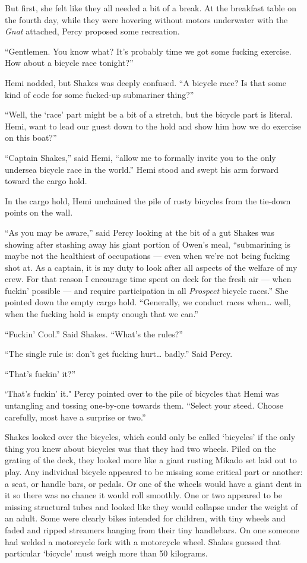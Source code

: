 \documentclass[]{scrbook}
\begin{document}
But first, she felt like they all needed a bit of a break. At the
breakfast table on the fourth day, while they were hovering without
motors underwater with the \emph{Gnat} attached, Percy proposed some
recreation.

``Gentlemen. You know what? It's probably time we got some fucking
exercise. How about a bicycle race tonight?''

Hemi nodded, but Shakes was deeply confused. ``A bicycle race? Is that
some kind of code for some fucked-up submariner thing?''

``Well, the `race' part might be a bit of a stretch, but the bicycle
part is literal. Hemi, want to lead our guest down to the hold and show
him how we do exercise on this boat?''

``Captain Shakes,'' said Hemi, ``allow me to formally invite you to the
only undersea bicycle race in the world.'' Hemi stood and swept his arm
forward toward the cargo hold.

In the cargo hold, Hemi unchained the pile of rusty bicycles from the
tie-down points on the wall.

``As you may be aware,'' said Percy looking at the bit of a gut Shakes
was showing after stashing away his giant portion of Owen's meal,
``submarining is maybe not the healthiest of occupations --- even when
we're not being fucking shot at. As a captain, it is my duty to look
after all aspects of the welfare of my crew. For that reason I encourage
time spent on deck for the fresh air --- when fuckin' possible --- and
require participation in all \emph{Prospect} bicycle races.'' She
pointed down the empty cargo hold. ``Generally, we conduct races
when\ldots{} well, when the fucking hold is empty enough that we can.''

``Fuckin' Cool.'' Said Shakes. ``What's the rules?''

``The single rule is: don't get fucking hurt\ldots{} badly.'' Said
Percy.

``That's fuckin' it?''

`That's fuckin' it." Percy pointed over to the pile of bicycles that
Hemi was untangling and tossing one-by-one towards them. ``Select your
steed. Choose carefully, most have a surprise or two.''

Shakes looked over the bicycles, which could only be called `bicycles'
if the only thing you knew about bicycles was that they had two wheels.
Piled on the grating of the deck, they looked more like a giant rusting
Mikado set laid out to play. Any individual bicycle appeared to be
missing some critical part or another: a seat, or handle bars, or
pedals. Or one of the wheels would have a giant dent in it so there was
no chance it would roll smoothly. One or two appeared to be missing
structural tubes and looked like they would collapse under the weight of
an adult. Some were clearly bikes intended for children, with tiny
wheels and faded and ripped streamers hanging from their tiny
handlebars. On one someone had welded a motorcycle fork with a
motorcycle wheel. Shakes guessed that particular `bicycle' must weigh
more than 50 kilograms.
\end{document}
